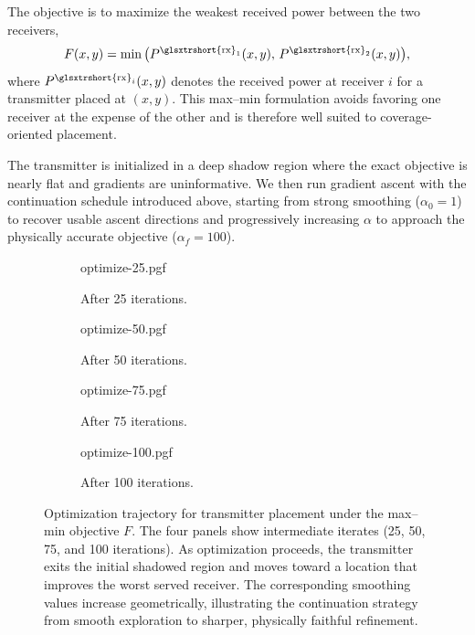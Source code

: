 The objective is to maximize the weakest received power between the two receivers,
\begin{equation}
F(x,y) = \min\big(P^{\text{\glsxtrshort{rx}}_1}(x,y),\,P^{\text{\glsxtrshort{rx}}_2}(x,y)\big),
\end{equation}
where $P^{\text{\glsxtrshort{rx}}_i}(x,y)$ denotes the received power at receiver $i$ for a transmitter placed at $(x,y)$. This max--min formulation avoids favoring one receiver at the expense of the other and is therefore well suited to coverage-oriented placement.

The transmitter is initialized in a deep \gls{shadow region} where the exact objective is nearly flat and gradients are uninformative. We then run gradient ascent with the continuation schedule introduced above, starting from strong smoothing ($\alpha_0 = 1$) to recover usable ascent directions and progressively increasing $\alpha$ to approach the physically accurate objective ($\alpha_f = 100$).

\begin{figure}
\centering
\begin{subfigure}[t]{0.24\contentwidth}
\centering
{optimize-25.pgf}
\caption{After 25 iterations.}
\end{subfigure}
\begin{subfigure}[t]{0.24\contentwidth}
\centering
{optimize-50.pgf}
\caption{After 50 iterations.}
\end{subfigure}
\begin{subfigure}[t]{0.24\contentwidth}
\centering
{optimize-75.pgf}
\caption{After 75 iterations.}
\end{subfigure}
\begin{subfigure}[t]{0.24\contentwidth}
\centering
{optimize-100.pgf}
\caption{After 100 iterations.}
\end{subfigure}
\caption{Optimization trajectory for transmitter placement under the max--min objective $F$. The four panels show intermediate iterates (25, 50, 75, and 100 iterations). As optimization proceeds, the transmitter exits the initial shadowed region and moves toward a location that improves the worst served receiver. The corresponding smoothing values increase geometrically, illustrating the continuation strategy from smooth exploration to sharper, physically faithful refinement.}
\end{figure}


